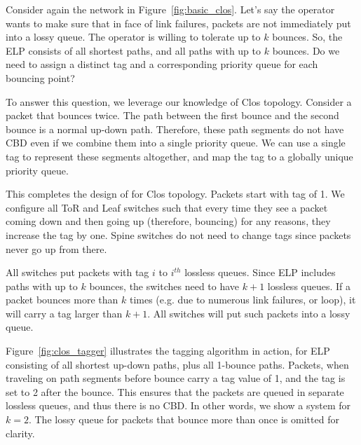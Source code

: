 Consider again the network in Figure~\ref{fig:basic_clos}.  Let's say the operator
wants to make sure that in face of link failures, packets are not immediately
put into a lossy queue. The operator is willing to tolerate up to $k$ bounces.
So, the ELP consists of all shortest paths, and all paths with up to $k$ bounces.
Do we need to assign a distinct tag and a corresponding priority queue for each
bouncing point?

To answer this question, we leverage our knowledge of Clos topology.  Consider a
packet that bounces twice. The path between the first bounce and the second
bounce is a normal up-down path. Therefore, these path segments do not have CBD
even if we combine them into a single priority queue. We can use a single tag to
represent these segments altogether, and map the tag to a globally unique
priority queue.

This completes the design of \sysname{} for Clos topology. Packets start with
tag of 1. We configure all ToR and Leaf switches such that every time they see
a packet coming down and then going up (therefore, bouncing) for any reasons,
they increase the tag by one. Spine switches do not need to change tags since
packets never go up from there.


All switches put packets with tag $i$ to $i^{th}$ lossless queues. Since ELP
includes paths with up to $k$ bounces, the switches need to have $k+1$ lossless
queues. If a packet bounces more than $k$ times (e.g. due to numerous link
failures, or loop), it will carry a tag larger than $k+1$. All switches will put
such packets into a lossy queue.


Figure~\ref{fig:clos_tagger} illustrates the tagging algorithm in action, for
ELP consisting of all shortest up-down paths, plus all 1-bounce paths.
Packets, when traveling on path segments before bounce carry a tag value of 1,
and the tag is set to 2 after the bounce. This ensures that the packets are
queued in separate lossless queues, and thus there is no CBD. In other words, we
show a system for $k=2$. The lossy queue for packets that bounce more than once
is omitted for clarity.

